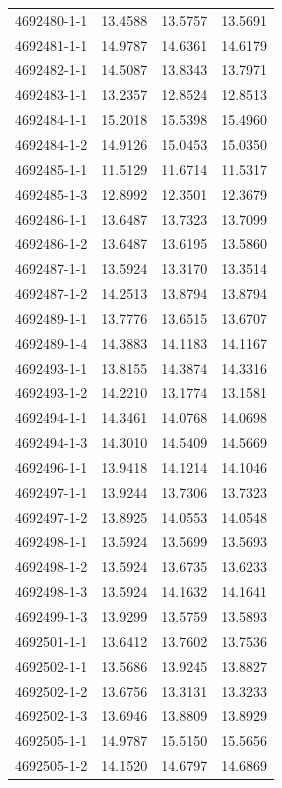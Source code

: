 \begin{longtable}{lrrr}
4692480-1-1 & 13.4588 & 13.5757 & 13.5691 \\
4692481-1-1 & 14.9787 & 14.6361 & 14.6179 \\
4692482-1-1 & 14.5087 & 13.8343 & 13.7971 \\
4692483-1-1 & 13.2357 & 12.8524 & 12.8513 \\
4692484-1-1 & 15.2018 & 15.5398 & 15.4960 \\
4692484-1-2 & 14.9126 & 15.0453 & 15.0350 \\
4692485-1-1 & 11.5129 & 11.6714 & 11.5317 \\
4692485-1-3 & 12.8992 & 12.3501 & 12.3679 \\
4692486-1-1 & 13.6487 & 13.7323 & 13.7099 \\
4692486-1-2 & 13.6487 & 13.6195 & 13.5860 \\
4692487-1-1 & 13.5924 & 13.3170 & 13.3514 \\
4692487-1-2 & 14.2513 & 13.8794 & 13.8794 \\
4692489-1-1 & 13.7776 & 13.6515 & 13.6707 \\
4692489-1-4 & 14.3883 & 14.1183 & 14.1167 \\
4692493-1-1 & 13.8155 & 14.3874 & 14.3316 \\
4692493-1-2 & 14.2210 & 13.1774 & 13.1581 \\
4692494-1-1 & 14.3461 & 14.0768 & 14.0698 \\
4692494-1-3 & 14.3010 & 14.5409 & 14.5669 \\
4692496-1-1 & 13.9418 & 14.1214 & 14.1046 \\
4692497-1-1 & 13.9244 & 13.7306 & 13.7323 \\
4692497-1-2 & 13.8925 & 14.0553 & 14.0548 \\
4692498-1-1 & 13.5924 & 13.5699 & 13.5693 \\
4692498-1-2 & 13.5924 & 13.6735 & 13.6233 \\
4692498-1-3 & 13.5924 & 14.1632 & 14.1641 \\
4692499-1-3 & 13.9299 & 13.5759 & 13.5893 \\
4692501-1-1 & 13.6412 & 13.7602 & 13.7536 \\
4692502-1-1 & 13.5686 & 13.9245 & 13.8827 \\
4692502-1-2 & 13.6756 & 13.3131 & 13.3233 \\
4692502-1-3 & 13.6946 & 13.8809 & 13.8929 \\
4692505-1-1 & 14.9787 & 15.5150 & 15.5656 \\
4692505-1-2 & 14.1520 & 14.6797 & 14.6869 \\

\end{longtable}
